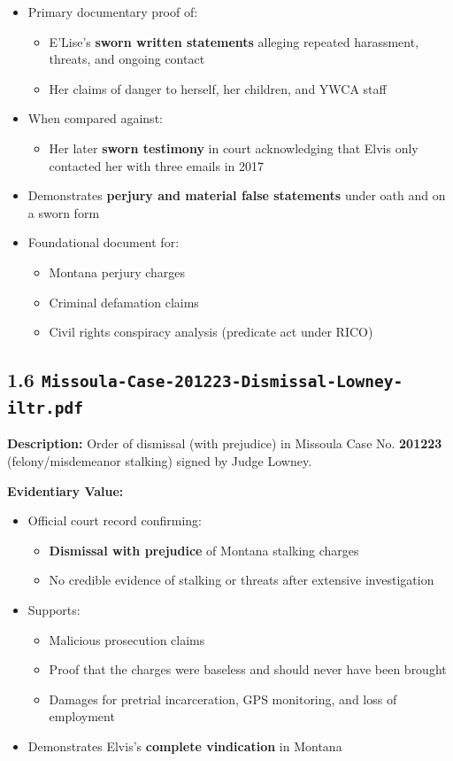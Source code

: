 \documentclass[11pt, letterpaper]{article}
\begin{document}
\begin{itemize}[leftmargin=*]
  \item Primary documentary proof of:
    \begin{itemize}
      \item E'Lise's \textbf{sworn written statements} alleging repeated harassment, threats, and ongoing contact
      \item Her claims of danger to herself, her children, and YWCA staff
    \end{itemize}
  \item When compared against:
    \begin{itemize}
      \item Her later \textbf{sworn testimony} in court acknowledging that Elvis only contacted her with three emails in 2017
    \end{itemize}
  \item Demonstrates \textbf{perjury and material false statements} under oath and on a sworn form
  \item Foundational document for:
    \begin{itemize}
      \item Montana perjury charges
      \item Criminal defamation claims
      \item Civil rights conspiracy analysis (predicate act under RICO)
    \end{itemize}
\end{itemize}

\subsection{1.6 \texttt{Missoula-Case-201223-Dismissal-Lowney-iltr.pdf}}

\textbf{Description:} Order of dismissal (with prejudice) in Missoula Case No. \textbf{201223} (felony/misdemeanor stalking) signed by Judge Lowney.

\textbf{Evidentiary Value:}

\begin{itemize}[leftmargin=*]
  \item Official court record confirming:
    \begin{itemize}
      \item \textbf{Dismissal with prejudice} of Montana stalking charges
      \item No credible evidence of stalking or threats after extensive investigation
    \end{itemize}
  \item Supports:
    \begin{itemize}
      \item Malicious prosecution claims
      \item Proof that the charges were baseless and should never have been brought
      \item Damages for pretrial incarceration, GPS monitoring, and loss of employment
    \end{itemize}
  \item Demonstrates Elvis's \textbf{complete vindication} in Montana
\end{itemize}
\end{document}

